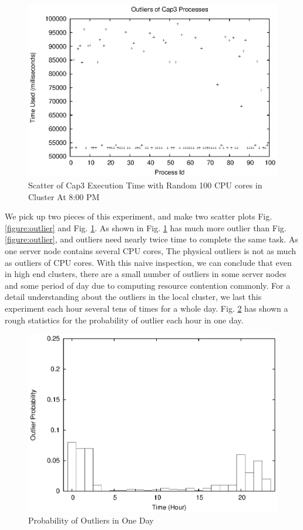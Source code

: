 \begin{figure}
\centering
\includegraphics[width=0.9\columnwidth]{figures/yaoutliers.eps}
\caption{Scatter of Cap3 Execution Time with Random 100 CPU cores in Cluster At 8:00 PM}
\label{figure:yaoutlier}
\end{figure}

We pick up two pieces of this experiment, and make two scatter plots Fig. \ref{figure:outlier} and Fig. \ref{figure:yaoutlier}. As shown in Fig. \ref{figure:yaoutlier} has much more outlier than Fig. \ref{figure:outlier}, and outliers need nearly twice time to complete the same task. As one server node contains several CPU cores, The physical outliers is not as much as outliers of CPU cores. With this naive inspection, we can conclude that even in high end clusters, there are a small number of outliers in some server nodes and some period of day due to computing resource contention commonly. For a detail understanding about the outliers in the local cluster, we last this experiment each hour several tens of times for a whole day. Fig. \ref{figure:outlier_stats} has shown a rough statistics for the probability of outlier each hour in one day.

\begin{figure}
\centering
\includegraphics[width=0.9\columnwidth]{figures/outlier_stats.eps}
\caption{Probability of Outliers in One Day}
\label{figure:outlier_stats}
\end{figure}

